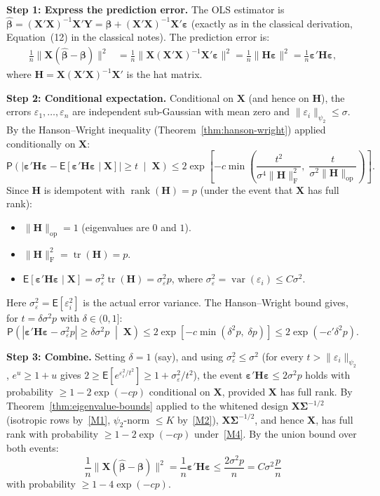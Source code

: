 \documentclass[12pt,a4paper]{article}
\makeatletter
\theoremstyle{definition}
\renewenvironment{proof}[1][\proofname]{\par
  \pushQED{\qed}%
  \normalfont \topsep6\p@\@plus6\p@\relax
  \trivlist
  \item[\hskip\labelsep\bfseries #1\@addpunct{.}]\ignorespaces
}{%
  \popQED\endtrivlist\@endpefalse
}
\newcommand\expc{\mathsf{E}}
\newcommand\prb{\mathsf{P}}
\DeclareMathOperator\var{var}
\DeclareMathOperator\tr{tr}
\DeclareMathOperator\rank{rank}
\newcommand{\bX}{\mathbf{X}}
\newcommand{\bY}{\mathbf{Y}}
\def\bb{\boldsymbol{\beta}}
\newcommand{\be}{\boldsymbol{\varepsilon}}
\newcommand{\bH}{\mathbf{H}}
\newcommand{\bSigma}{\boldsymbol{\Sigma}}
\newcommand{\hbb}{\hat{\boldsymbol{\beta}}}
\newcommand{\opnorm}[1]{\|#1\|_{\mathrm{op}}}
\newcommand{\fnorm}[1]{\|#1\|_{\mathrm{F}}}
\makeatother
\begin{document}
\begin{proof}
\textbf{Step 1: Express the prediction error.} The OLS estimator is $\hbb = (\bX'\bX)^{-1}\bX'\bY = \bb + (\bX'\bX)^{-1}\bX'\be$ (exactly as in the classical derivation, Equation~(12) in the classical notes). The prediction error is:
\begin{align}
\frac{1}{n}\|\bX(\hbb - \bb)\|^2 &= \frac{1}{n}\|\bX(\bX'\bX)^{-1}\bX'\be\|^2 = \frac{1}{n}\|\bH\be\|^2 = \frac{1}{n}\be'\bH\be, \label{eq:pred-err-qf}
\end{align}
where $\bH = \bX(\bX'\bX)^{-1}\bX'$ is the hat matrix.

\textbf{Step 2: Conditional expectation.} Conditional on $\bX$ (and hence on $\bH$), the errors $\varepsilon_1, \ldots, \varepsilon_n$ are independent sub-Gaussian with mean zero and $\|\varepsilon_i\|_{\psi_2} \leqslant \sigma$. By the Hanson--Wright inequality (Theorem~\ref{thm:hanson-wright}) applied conditionally on $\bX$:
\[
\prb\!\left(\left|\be'\bH\be - \expc[\be'\bH\be \mid \bX]\right| \geqslant t \;\middle|\; \bX\right) \leqslant 2\exp\!\left[-c\min\!\left(\frac{t^2}{\sigma^4\fnorm{\bH}^2},\; \frac{t}{\sigma^2\opnorm{\bH}}\right)\right].
\]
Since $\bH$ is idempotent with $\rank(\bH) = p$ (under the event that $\bX$ has full rank):
\begin{itemize}
\item $\opnorm{\bH} = 1$ (eigenvalues are $0$ and $1$).
\item $\fnorm{\bH}^2 = \tr(\bH) = p$.
\item $\expc[\be'\bH\be \mid \bX] = \sigma_\varepsilon^2\tr(\bH) = \sigma_\varepsilon^2 p$, where $\sigma_\varepsilon^2 = \var(\varepsilon_i) \leqslant C\sigma^2$.
\end{itemize}
Here $\sigma_\varepsilon^2 = \expc[\varepsilon_i^2]$ is the actual error variance. The Hanson--Wright bound gives, for $t = \delta\sigma^2 p$ with $\delta \in (0,1]$:
\[
\prb\!\left(|\be'\bH\be - \sigma_\varepsilon^2 p| \geqslant \delta\sigma^2 p \;\middle|\; \bX\right) \leqslant 2\exp\!\left[-c\min(\delta^2 p,\; \delta p)\right] \leqslant 2\exp(-c'\delta^2 p).
\]

\textbf{Step 3: Combine.} Setting $\delta = 1$ (say), and using $\sigma_\varepsilon^2 \leqslant \sigma^2$ (for every $t > \|\varepsilon_i\|_{\psi_2}$, $e^u \geqslant 1 + u$ gives $2 \geqslant \expc[e^{\varepsilon_i^2/t^2}] \geqslant 1 + \sigma_\varepsilon^2/t^2$), the event $\be'\bH\be \leqslant 2\sigma^2 p$ holds with probability $\geqslant 1 - 2\exp(-cp)$ conditional on $\bX$, provided $\bX$ has full rank. By Theorem~\ref{thm:eigenvalue-bounds} applied to the whitened design $\bX\bSigma^{-1/2}$ (isotropic rows by~\ref{M1}, $\psi_2$-norm $\leqslant K$ by~\ref{M2}), $\bX\bSigma^{-1/2}$, and hence $\bX$, has full rank with probability $\geqslant 1 - 2\exp(-cp)$ under~\ref{M4}. By the union bound over both events:
\[
\frac{1}{n}\|\bX(\hbb - \bb)\|^2 = \frac{1}{n}\be'\bH\be \leqslant \frac{2\sigma^2 p}{n} = C\sigma^2\frac{p}{n}
\]
with probability $\geqslant 1 - 4\exp(-cp)$.
\end{proof}
\end{document}
